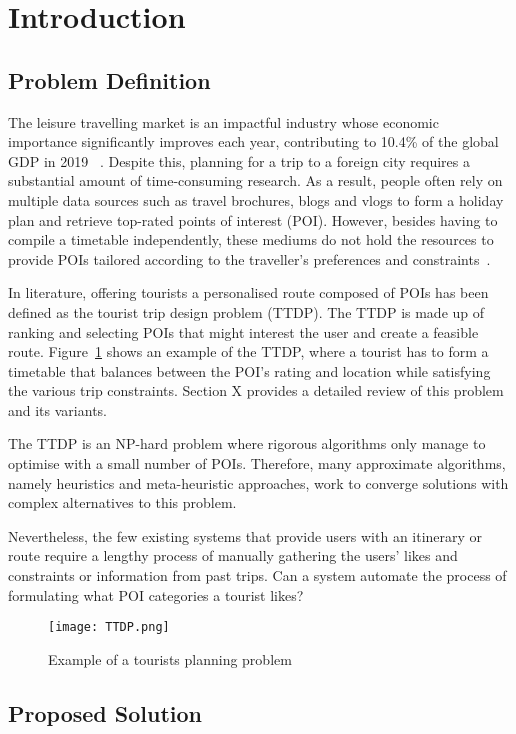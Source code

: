 \section{Introduction}

\subsection{Problem Definition}
The leisure travelling market is an impactful industry
whose economic importance significantly improves each
year, contributing to 10.4\% of the global GDP in 2019
~\cite{wttc2018travel}. Despite this, planning for a trip to a
foreign city requires a substantial amount of
time-consuming research. As a result, people often
rely on multiple data sources such as travel
brochures, blogs and vlogs to form a holiday plan and
retrieve top-rated points of interest (POI). However,
besides having to compile a timetable independently,
these mediums do not hold the resources to provide
POIs tailored according to the traveller's preferences
and constraints~\cite{DeChoudhury2010}. 

In literature, offering tourists a personalised route
composed of POIs has been defined as the tourist trip
design problem (TTDP). The TTDP is made up of ranking
and selecting POIs that might interest the user and
create a feasible route. Figure~\ref{TTDP} shows an example
of the TTDP,  where a tourist has to form a timetable
that balances between the POI's rating and location
while satisfying the various trip constraints. Section
X provides a detailed review of this problem and its
variants.  

The TTDP is an NP-hard problem where rigorous
algorithms only manage to optimise with a small number
of POIs. Therefore, many approximate algorithms,
namely heuristics and meta-heuristic approaches, work
to converge solutions with complex alternatives to
this problem.

Nevertheless, the few existing systems that provide
users with an itinerary or route require a lengthy
process of manually gathering the users' likes and
constraints or information from past trips. 
Can a system automate the process of formulating what
POI categories a tourist likes?

\begin{figure}[h]
\centering
\texttt{[image: TTDP.png]}
\caption{Example of a tourists planning problem}
\label{TTDP}
\end{figure}

\subsection{Proposed Solution}

